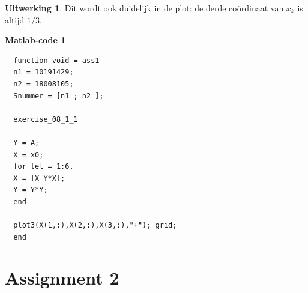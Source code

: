 \documentclass[11pt]{amsart}
\theoremstyle{definition}
\newtheorem*{uitwerking}{Uitwerking}
\newtheorem*{matlab}{Matlab-code}
\begin{document}
\begin{uitwerking}
  Dit wordt ook duidelijk in de plot: de derde co\"ordinaat van $x_k$ is altijd $1/3$.
\end{uitwerking}

\begin{matlab}~

\begin{verbatim}
  function void = ass1
  n1 = 10191429;
  n2 = 18008105;
  Snummer = [n1 ; n2 ];

  exercise_08_1_1

  Y = A;
  X = x0;
  for tel = 1:6,
  X = [X Y*X];
  Y = Y*Y;
  end

  plot3(X(1,:),X(2,:),X(3,:),"+"); grid;
  end
\end{verbatim}
\end{matlab}

\section*{Assignment 2}
\end{document}
